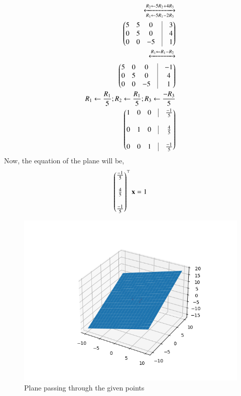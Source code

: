 \documentclass[A4,10pt,twocolumn]{IEEEtran}
\begin{document}
\begin{align}
\xleftrightarrow[R_1 \leftarrow 5R_1 - 2R_3]{R_2 \leftarrow 5R_2 + 4R_3}\\
\myvec{5&5&0&\vrule&3\\0&5&0&\vrule&4\\0&0&-5&\vrule&1}\\
\xleftrightarrow{R_1 \leftarrow R_1 - R_2}\\
\myvec{5&0&0&\vrule&-1\\0&5&0&\vrule&4\\0&0&-5&\vrule&1}\\
{R_1 \leftarrow \frac{R_1}{5}} ; {R_2 \leftarrow \frac{R_1}{5}}; {R_3 \leftarrow \frac{-R_3}{5}}\\
\myvec{1&0&0&\vrule&\frac{-1}{5}\\  \\ 0&1&0&\vrule&\frac{4}{5}\\ \\0&0&1&\vrule&\frac{-1}{5}}
\end{align}
Now, the equation of the plane will be,
\begin{align}
\begin{pmatrix}\frac{-1}{5}\\ \\ \frac{4}{5}\\ \\ \frac{-1}{5}\end{pmatrix}^\top \mathbf{x} = 1
\end{align}
\begin{figure}[h!]
  \centering
   \includegraphics[width=\columnwidth]{figs/plane_b.png}
    \caption{Plane passing through the given points }
     \label{fig:2}
     \end{figure} 
\end{document}
